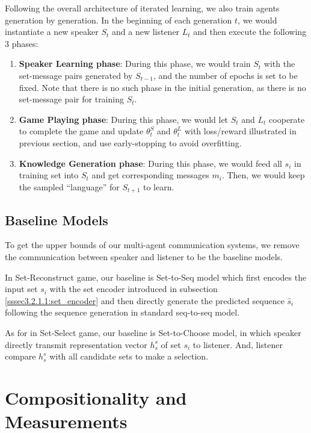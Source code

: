 Following the overall architecture of iterated learning, we also train agents generation by generation. In the beginning of each generation $t$, we would instantiate a new speaker $S_t$ and a new listener $L_t$ and then execute the following 3 phases:

\begin{enumerate}
  \item \textbf{Speaker Learning phase}: During this phase, we would train $S_t$ with the set-message pairs generated by $S_{t-1}$, and the number of epochs is set to be fixed. Note that there is no such phase in the initial generation, as there is no set-message pair for training $S_t$.
  \item \textbf{Game Playing phase}: During this phase, we would let $S_t$ and $L_t$ cooperate to complete the game and update $\theta^S_t$ and $\theta^L_t$ with loss/reward illustrated in previous section, and use early-stopping to avoid overfitting.
  \item \textbf{Knowledge Generation phase}: During this phase, we would feed all $s_i$ in training set into $S_t$ and get corresponding messages $m_i$. Then, we would keep the sampled ``language'' for $S_{t+1}$ to learn.
\end{enumerate}

\subsection{Baseline Models}
\label{ssec3.2.5:baselines}

To get the upper bounds of our multi-agent communication systems, we remove the communication between speaker and listener to be the baseline models.

In Set-Reconstruct game, our baseline is Set-to-Seq model which first encodes the input set $s_i$ with the set encoder introduced in subsection \ref{sssec3.2.1.1:set_encoder} and then directly generate the predicted sequence $\hat{s}_i$ following the sequence generation in standard seq-to-seq model.

As for in Set-Select game, our baseline is Set-to-Choose model, in which speaker directly transmit representation vector $h^s_s$ of set $s_i$ to listener. And, listener compare $h^s_s$ with all candidate sets to make a selection.

\section{Compositionality and Measurements}
\label{sec3.3:measurements}

